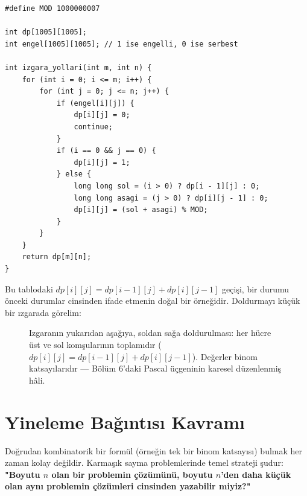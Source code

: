 \begin{lstlisting}[language=CTemel]
#define MOD 1000000007

int dp[1005][1005];
int engel[1005][1005]; // 1 ise engelli, 0 ise serbest

int izgara_yollari(int m, int n) {
    for (int i = 0; i <= m; i++) {
        for (int j = 0; j <= n; j++) {
            if (engel[i][j]) {
                dp[i][j] = 0;
                continue;
            }
            if (i == 0 && j == 0) {
                dp[i][j] = 1;
            } else {
                long long sol = (i > 0) ? dp[i - 1][j] : 0;
                long long asagi = (j > 0) ? dp[i][j - 1] : 0;
                dp[i][j] = (sol + asagi) % MOD;
            }
        }
    }
    return dp[m][n];
}
\end{lstlisting}

Bu tablodaki $dp[i][j] = dp[i-1][j] + dp[i][j-1]$ geçişi, bir durumu önceki durumlar cinsinden ifade etmenin doğal bir örneğidir. Doldurmayı küçük bir ızgarada görelim:

\begin{figure}[ht]
\centering
{}
\caption{Izgaranın yukarıdan aşağıya, soldan sağa doldurulması: her hücre üst ve
sol komşularının toplamıdır ($dp[i][j] = dp[i-1][j] + dp[i][j-1]$). Değerler binom
katsayılarıdır — Bölüm 6'daki Pascal üçgeninin karesel düzenlenmiş hâli.}
\end{figure}

\section{Yineleme Bağıntısı Kavramı}

Doğrudan kombinatorik bir formül (örneğin tek bir binom katsayısı) bulmak her zaman kolay değildir. Karmaşık sayma problemlerinde temel strateji şudur: \textbf{"Boyutu $n$ olan bir problemin çözümünü, boyutu $n$'den daha küçük olan aynı problemin çözümleri cinsinden yazabilir miyiz?"} 

